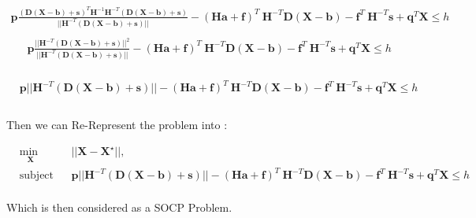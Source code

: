 \documentclass[12pt]{article}
\begin{document}
\begin{equation}
\begin{aligned}
\mathbf{p} \frac{(\mathbf{D}(\mathbf{X}-\mathbf{b})+\mathbf{s})^T \mathbf{H}^{-1}\mathbf{H}^{-T}(\mathbf{D}(\mathbf{X}-\mathbf{b})+\mathbf{s}) } {||\mathbf{H}^{-T}(\mathbf{D}(\mathbf{X}-\mathbf{b})+\mathbf{s})||}-(\mathbf{H}\mathbf{a}+\mathbf{f})^T\ \mathbf{H}^{-T}\mathbf{D}(\mathbf{X}-\mathbf{b})-\mathbf{f}^T\ \mathbf{H}^{-T}\mathbf{s}+\mathbf{q}^T\mathbf{X} \leq h  \\ 
\end{aligned}
\end{equation}
\begin{equation}
\begin{aligned}
& \mathbf{p} \frac{||\mathbf{H}^{-T}(\mathbf{D}(\mathbf{X}-\mathbf{b})+\mathbf{s})||^2}{||\mathbf{H}^{-T}(\mathbf{D}(\mathbf{X}-\mathbf{b})+\mathbf{s})||}-(\mathbf{H}\mathbf{a}+\mathbf{f})^T\ \mathbf{H}^{-T}\mathbf{D}(\mathbf{X}-\mathbf{b})-\mathbf{f}^T\ \mathbf{H}^{-T}\mathbf{s}+\mathbf{q}^T\mathbf{X} \leq h  \\
\end{aligned}
\end{equation}


\begin{equation}
\begin{aligned}
& \mathbf{p} ||\mathbf{H}^{-T}(\mathbf{D}(\mathbf{X}-\mathbf{b})+\mathbf{s})|| -(\mathbf{H}\mathbf{a}+\mathbf{f})^T\ \mathbf{H}^{-T}\mathbf{D}(\mathbf{X}-\mathbf{b})-\mathbf{f}^T\ \mathbf{H}^{-T}\mathbf{s}+\mathbf{q}^T\mathbf{X} \leq h  \\ \\
\end{aligned}
\end{equation}

Then we can Re-Represent the problem into :

%
\begin{equation}
\begin{aligned}
& \underset{\mathbf{X}}{\text{min }}
& & || \mathbf{X} - \mathbf{ X^\star} ||, \\
& \text{subject to}
& & \mathbf{p} ||\mathbf{H}^{-T}(\mathbf{D}(\mathbf{X}-\mathbf{b})+\mathbf{s})|| -(\mathbf{H}\mathbf{a}+\mathbf{f})^T\ \mathbf{H}^{-T}\mathbf{D}(\mathbf{X}-\mathbf{b})-\mathbf{f}^T\ \mathbf{H}^{-T}\mathbf{s}+\mathbf{q}^T\mathbf{X} \leq h  \\ 
\end{aligned}
\end{equation}

Which is then considered as a SOCP Problem.
\end{document}
